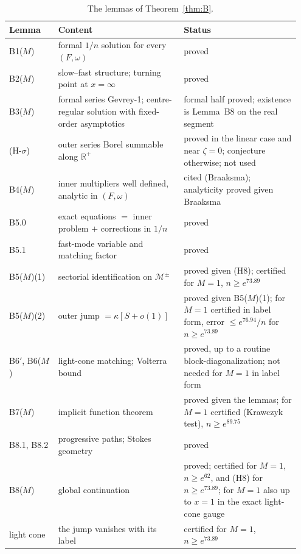 \documentclass{amsart}
\numberwithin{equation}{section}
\theoremstyle{plain}
\theoremstyle{definition}
\theoremstyle{remark}
\begin{document}
\begin{table}[t]
\caption{The lemmas of Theorem~\ref{thm:B}.}
\label{tab:Bstatus}
\footnotesize
\begin{tabular}{@{}p{0.16\linewidth}p{0.41\linewidth}p{0.38\linewidth}@{}}
\toprule
Lemma & Content & Status \\
\midrule
B1($M$) & formal $1/n$ solution for every $(F, \omega)$ & proved \\
B2($M$) & slow--fast structure; turning point at $x = \infty$ & proved \\
B3($M$) & formal series Gevrey-1; centre-regular solution with fixed-order asymptotics & formal half proved; existence is Lemma~B8 on the real segment \\
(H-$\sigma$) & outer series Borel summable along $\mathbb R^+$ & proved in the linear case and near $\zeta = 0$; conjecture otherwise; not used \\
B4($M$) & inner multipliers well defined, analytic in $(F, \omega)$ & cited (Braaksma); analyticity proved given Braaksma \\
B5.0 & exact equations $=$ inner problem $+$ corrections in $1/n$ & proved \\
B5.1 & fast-mode variable and matching factor & proved \\
B5($M$)(1) & sectorial identification on $\mathcal M^\pm$ & proved given (H8); certified for $M = 1$, $n \ge e^{73.89}$ \\
B5($M$)(2) & outer jump $= \kappa[S + o(1)]$ & proved given B5($M$)(1); for $M = 1$ certified in label form, error $\le e^{76.94}/n$ for $n \ge e^{73.89}$ \\
B6$'$, B6($M$) & light-cone matching; Volterra bound & proved, up to a routine block-diagonalization; not needed for $M = 1$ in label form \\
B7($M$) & implicit function theorem & proved given the lemmas; for $M = 1$ certified (Krawczyk test), $n \ge e^{89.75}$ \\
B8.1, B8.2 & progressive paths; Stokes geometry & proved \\
B8($M$) & global continuation & proved; certified for $M = 1$, $n \ge e^{62}$, and (H8) for $n \ge e^{73.89}$; for $M = 1$ also up to $x = 1$ in the exact light-cone gauge \\
light cone & the jump vanishes with its label & certified for $M = 1$, $n \ge e^{73.89}$ \\
\bottomrule
\end{tabular}
\end{table}
\end{document}
